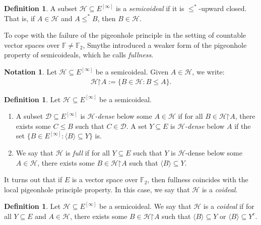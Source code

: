 \documentclass[10pt,a4paper]{amsart}
\theoremstyle{plain}
\numberwithin{equation}{section}
\theoremstyle{definition}
\newtheorem{definition}[theorem]{Definition}
\newtheorem{notation}[theorem]{Notation}
\renewcommand{\c}[1]{\langle #1 \rangle}
\newcommand{\cal}{\mathcal}
\newcommand{\restrictedto}{\mathord{\upharpoonright}}
\renewcommand{\H}{\cal{H}}
\newcommand{\D}{\cal{D}}
\begin{document}
\begin{definition}
\label{def:semicoideal}
    A subset $\H \subseteq E^{[\infty]}$ is a \emph{semicoideal} if it is $\leq^*$-upward closed. That is, if $A \in \H$ and $A \leq^* B$, then $B \in \H$.
\end{definition}

To cope with the failure of the pigeonhole principle in the setting of countable vector spaces over $\mathbb{F} \neq \mathbb{F}_2$, Smythe introduced a weaker form of the pigeonhole property of semicoideals, which he calls \emph{fullness}.

\begin{notation}
    Let $\H \subseteq E^{[\infty]}$ be a semicoideal. Given $A \in \H$, we write:
    \begin{align*}
        \H\restrictedto A := \{B \in \H : B \leq A\}.
    \end{align*}
\end{notation}

\begin{definition}
\label{def:full.semicoideal}
    Let $\H \subseteq E^{[\infty]}$ be a semicoideal.
    \begin{enumerate}
        \item A subset $\D \subseteq E^{[\infty]}$ is \emph{$\H$-dense} below some $A \in \H$ if for all $B \in \H\restrictedto A$, there exists some $C \leq B$ such that $C \in \D$. A set $Y \subseteq E$ is \emph{$\H$-dense} below $A$ if the set $\{B \in E^{[\infty]} : \c{B} \subseteq Y\}$ is.

        \item We say that $\H$ is \emph{full} if for all $Y \subseteq E$ such that $Y$ is $\H$-dense below some $A \in \H$, there exists some $B \in \H\restrictedto A$ such that $\c{B} \subseteq Y$.
    \end{enumerate}
\end{definition}

It turns out that if $E$ is a vector space over $\mathbb{F}_2$, then fullness coincides with the local pigeonhole principle property. In this case, we say that $\H$ is a \emph{coideal}.

\begin{definition}
\label{def:coideal.vector.spaces}
    Let $\H \subseteq E^{[\infty]}$ be a semicoideal. We say that $\H$ is a \emph{coideal} if for all $Y \subseteq E$ and $A \in \H$, there exists some $B \in \H\restrictedto A$ such that $\c{B} \subseteq Y$ or $\c{B} \subseteq Y^c$.
\end{definition}
\end{document}
